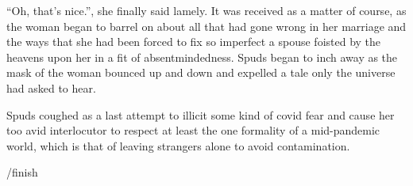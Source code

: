 \documentclass[ebook, 10pt, openright, onecolumn]{memoir}
\begin{document}
``Oh, that's nice.'', she finally said lamely.  It was received as a matter of
course, as the woman began to barrel on about all that had gone wrong in her
marriage and the ways that she had been forced to fix so imperfect a spouse
foisted by the heavens upon her in a fit of absentmindedness.  Spuds began to
inch away as the mask of the woman bounced up and down and expelled a tale only
the universe had asked to hear.

Spuds coughed as a last attempt to illicit some kind of covid fear and cause her
too avid interlocutor to respect at least the one formality of a mid-pandemic
world, which is that of leaving strangers alone to avoid contamination.

/finish
\end{document}
